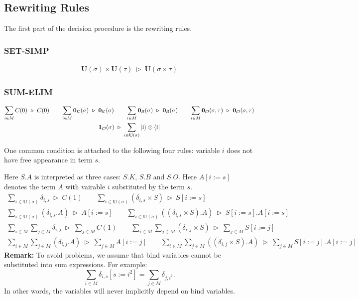 \documentclass[manuscript, review, timestamp]{acmart}
\newcommand*{\reduce}{\ \triangleright\ }
\begin{document}
\subsection{Rewriting Rules}
The first part of the decision procedure is the rewriting rules.

\subsubsection*{\textsf{SET-SIMP}}
\begin{gather*}
  \mathbf{U}(\sigma) \times \mathbf{U}(\tau) \reduce \mathbf{U}(\sigma \times \tau)
\end{gather*}

\subsubsection*{\textsf{SUM-ELIM}}
\begin{gather*}
  \sum_{i \in M} C(0) \reduce C(0)
  \qquad
  \sum_{i \in M} \mathbf{0}_\mathcal{K}(\sigma) \reduce \mathbf{0}_\mathcal{K}(\sigma)
  \qquad
  \sum_{i \in M} \mathbf{0}_\mathcal{B}(\sigma) \reduce \mathbf{0}_\mathcal{B}(\sigma)
  \qquad
  \sum_{i \in M} \mathbf{0}_\mathcal{O}(\sigma, \tau) \reduce \mathbf{0}_\mathcal{O}(\sigma, \tau)\\
  \mathbf{1}_\mathcal{O}(\sigma) \reduce \sum_{i \in \mathbf{U}(\sigma)} \ket{i}\otimes\bra{i}
\end{gather*}

One common condition is attached to the following four rules: variable $i$ does not have free appearance in term $s$.

Here $S.A$ is interpreted as three cases: $S.K$, $S.B$ and $S.O$. Here $A[i:=s]$ denotes the term $A$ with vairable $i$ substituted by the term $s$.
\begin{gather*}
  \sum_{i \in \mathbf{U}(\sigma)} \delta_{i, s} \reduce C(1)
  \qquad
  \sum_{i \in \mathbf{U}(\sigma)} (\delta_{i, s} \times S) \reduce S[i:=s] \\
  \sum_{i \in \mathbf{U}(\sigma)} (\delta_{i, s}.A) \reduce A[i:=s]
  \qquad
  \sum_{i \in \mathbf{U}(\sigma)} ((\delta_{i, s} \times S).A) \reduce S[i:=s].A[i:=s]
\end{gather*}
\begin{gather*}
  \sum_{i \in M} \sum_{j \in M} \delta_{i, j} \reduce \sum_{j \in M} C(1)
  \qquad
  \sum_{i \in M} \sum_{j \in M} (\delta_{i, j} \times S) \reduce \sum_{j \in M} S[i:=j] \\
  \sum_{i \in M} \sum_{j \in M} (\delta_{i, j}.A) \reduce \sum_{j \in M} A[i:=j]
  \qquad
  \sum_{i \in M} \sum_{j \in M} ((\delta_{i, j} \times S).A) \reduce \sum_{j \in M} S[i:=j].A[i:=j]
\end{gather*}
\textbf{Remark:} To avoid problems, we assume that bind variables cannot be substituted into sum expressions. For example:
$$
\sum_{i \in M} \delta_{i, s}[s:=i^2] = \sum_{j \in M} \delta_{j, i^2}.
$$
In other words, the variables will never implicitly depend on bind variables.
\end{document}
